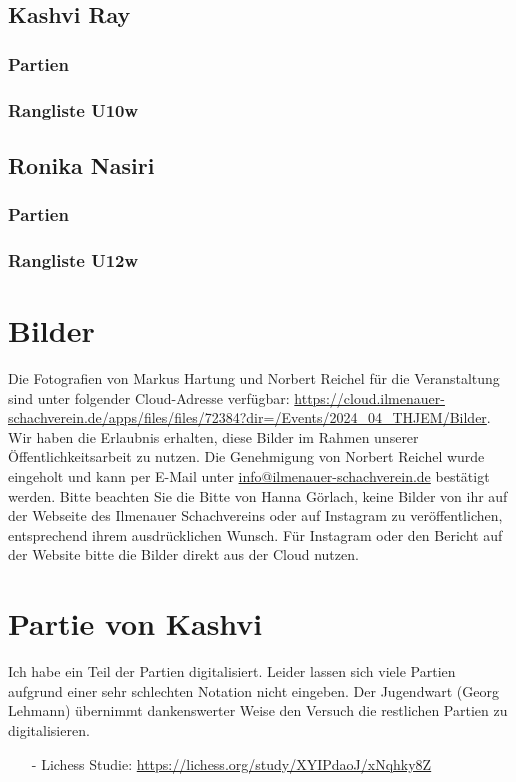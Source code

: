 \documentclass[a4paper,ngerman]{tui-algo-seminar}
\begin{document}
\subsection{Kashvi Ray}
    \subsubsection{Partien}
        
    \subsubsection{Rangliste U10w}
        
\clearpage

\subsection{Ronika Nasiri}
    \subsubsection{Partien}
        
    \subsubsection{Rangliste U12w}
        
    
\clearpage


\section{Bilder}
Die Fotografien von Markus Hartung und Norbert Reichel für die Veranstaltung sind unter folgender Cloud-Adresse verfügbar: \url{https://cloud.ilmenauer-schachverein.de/apps/files/files/72384?dir=/Events/2024_04_THJEM/Bilder}. Wir haben die Erlaubnis erhalten, diese Bilder im Rahmen unserer Öffentlichkeitsarbeit zu nutzen. Die Genehmigung von Norbert Reichel wurde eingeholt und kann per E-Mail unter \href{mailto:info@ilmenauer-schachverein.de}{info@ilmenauer-schachverein.de} bestätigt werden.
Bitte beachten Sie die Bitte von Hanna Görlach, keine Bilder von ihr auf der Webseite des Ilmenauer Schachvereins oder auf Instagram zu veröffentlichen, entsprechend ihrem ausdrücklichen Wunsch. Für Instagram oder den Bericht auf der Website bitte die Bilder direkt aus der Cloud nutzen.




\clearpage
\section{Partie von Kashvi}
Ich habe ein Teil der Partien digitalisiert. Leider lassen sich viele Partien aufgrund einer sehr schlechten Notation nicht eingeben. Der Jugendwart (Georg Lehmann) übernimmt dankenswerter Weise den Versuch die restlichen Partien zu digitalisieren.
\begin{itemize}
    \item[-] Lichess Studie: \url{https://lichess.org/study/XYIPdaoJ/xNqhky8Z}
\end{itemize}
\end{document}
